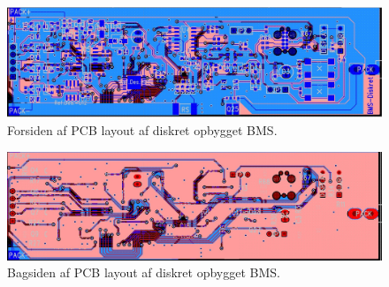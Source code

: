 \begin{figure}[h]
	\centering
	\includegraphics[width=15cm]{billeder/Diskret_1.jpg}
	\caption{Forsiden af PCB layout af diskret opbygget BMS.}
	\label{fig:PCB_diskret}
\end{figure}

\begin{figure}[h]
	\centering
	\includegraphics[width=15cm]{billeder/Diskret_3.jpg}
	\caption{Bagsiden af PCB layout af diskret opbygget BMS.}
	\label{fig:PCB_diskret_bagside}
\end{figure}
